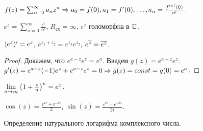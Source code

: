 \begin{note}
	$f(z) = \sum_{n = 0}^\infty a_n z^n \Rightarrow a_0 = f(0), a_1 = f'(0), \ldots, a_n = \frac{f^{(n)}(0)}{n!}$.
\end{note}

\begin{definition}
	$e^z = \sum_{n = 0}^\infty \frac{z^n}{n!}$, $R_\text{сх} = \infty$, $e^z$ голоморфна в $\mathbb{C}$.
\end{definition}

\begin{note}
	$\mathopen{}\left( e^z \right)\mathclose{}' = e^z$, $e^{z_1 + z_2} = e^{z_1} e^{z_2}$, $e^{\overline z} = \overline{e^z}$.
\end{note}
\begin{proof}
	Докажем, что $e^{a - z} e^{z} = e^a$. Введем $g(z) = e^{a - z} e^z$. $g'(z) = e^{a - z} (-1) e^z + e^{a - z} e^z = 0 \Rightarrow g(z) = const = g(0) = e^a$.
\end{proof}

\begin{note}
	$\lim\limits_{n \to \infty} {\mathopen{}\left( 1 + \frac{z}{n} \right)\mathclose{}}^n = e^z$.
\end{note}

\begin{definition}
	$\cos(z) = \frac{e^{iz} + e^{-iz}}{2}$, $\sin(z) = \frac{e^{iz} - e^{-iz}}{2i}$.
\end{definition}

{\color{red} Определение натурального логарифма комплексного числа.}
